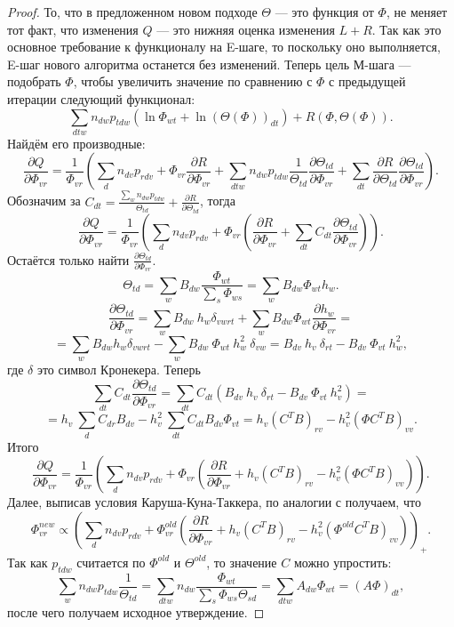 \begin{proof}
То, что в предложенном новом подходе $\Theta$ --- это функция от $\Phi$, не меняет тот факт, что изменения $Q$ --- это нижняя оценка изменения $L + R$. Так как это основное требование к функционалу на E-шаге, то поскольку оно выполняется, E-шаг нового алгоритма останется без изменений. Теперь цель М-шага --- подобрать $\Phi$, чтобы увеличить значение по сравнению с $\Phi$ с предыдущей итерации следующий функционал: 
\[
\sum_{dtw} n_{dw} p_{tdw} \left( \ln \Phi_{wt} + \ln (\Theta(\Phi))_{dt}\right) + R(\Phi, \Theta(\Phi)).
\]
Найдём его производные:
\[
\frac{\partial{Q}}{\partial{\Phi_{vr}}} = \frac{1}{\Phi_{vr}} \left( \sum_{d} n_{dv} p_{rdv} + \Phi_{vr} \frac{\partial{R}}{\partial{\Phi_{vr}}} + \sum_{dtw} n_{dw} p_{tdw} \frac{1}{\Theta_{td}} \frac{\partial{\Theta_{td}}}{\partial{\Phi_{vr}}} +  \sum_{dt} \frac{\partial{R}}{\partial{\Theta_{td}}} \frac{\partial{\Theta_{td}}}{\partial{\Phi_{vr}}} \right).
\]
Обозначим за $C_{dt} = \displaystyle\frac{\sum_w n_{dw} p_{tdw} }{\Theta_{td}} + \frac{\partial{R}}{\partial{\Theta_{td}}}$, тогда
\[
\frac{\partial{Q}}{\partial{\Phi_{vr}}} = \frac{1}{\Phi_{vr}} \left( \sum_{d} n_{dv} p_{rdv} + \Phi_{vr}\left( \frac{\partial{R}}{\partial{\Phi_{vr}}} + \sum_{dt} C_{dt} \frac{\partial{\Theta_{td}}}{\partial{\Phi_{vr}}} \right) \right).
\]
Остаётся только найти $\displaystyle\frac{\partial{\Theta_{td}}}{\partial{\Phi_{vr}}}$.
\[
\Theta_{td} = \sum_{w} B_{dw} \frac{\Phi_{wt}}{\sum_s \Phi_{ws}} = \sum_{w} B_{dw} \Phi_{wt} h_w.
\]
\[
\frac{\partial{\Theta_{td}}}{\partial{\Phi_{vr}}} =  \sum_{w} B_{dw}~h_w \delta_{vwrt} +  \sum_{w} B_{dw} \Phi_{wt} \frac{\partial{h_w}}{\partial{\Phi_{vr}}} = 
\]
\[
= \sum_{w} B_{dw} h_w \delta_{vwrt} - \sum_{w} B_{dw}~\Phi_{wt}~h_w^2~\delta_{vw} =
B_{dv}~h_v~\delta_{rt} - B_{dv}~\Phi_{vt}~h_w^2,
\]
где $\delta$ это символ Кронекера. Теперь
\[
\sum_{dt} C_{dt} \frac{\partial{\Theta_{td}}}{\partial{\Phi_{vr}}} = \sum_{dt} C_{dt} \left( B_{dv}~h_v~\delta_{rt} - B_{dv}~\Phi_{vt}~h_v^2 \right) =  
\]
\[
= h_v~\sum_d C_{dr} B_{dv} -  h_v^2~\sum_{dt} C_{dt} B_{dv} \Phi_{vt} = h_v (C^T B)_{rv} - h_v^2 (\Phi C^T B)_{vv}.
\]
Итого
\[
\frac{\partial{Q}}{\partial{\Phi_{vr}}}  = \frac{1}{\Phi_{vr}} \left( \sum_{d} n_{dv} p_{rdv} + \Phi_{vr}\left( \frac{\partial{R}}{\partial{\Phi_{vr}}} + h_v (C^T B)_{rv} - h_v^2 (\Phi C^T B)_{vv} \right) \right).
\]
Далее, выписав условия Каруша-Куна-Таккера, по аналогии с \cite{vorontsov2015} получаем, что
\[
\Phi_{vr}^{new}  \propto \left( \sum_{d} n_{dv} p_{rdv} + \Phi_{vr}^{old} \left( \frac{\partial{R}}{\partial{\Phi_{vr}}} + h_v (C^T B)_{rv} - h_v^2 ({\Phi^{old}} C^T B)_{vv} \right) \right)_{+}.
\]
Так как $p_{tdw}$ считается по $\Phi^{old}$ и $\Theta^{old}$, то значение $C$ можно упростить:
\[
\sum_{w} n_{dw} p_{tdw} \frac{1}{\Theta_{td}}  = \sum_{dtw} n_{dw}\frac{\Phi_{wt}}{\sum_s \Phi_{ws} \Theta_{sd}}  = \sum_{dtw} A_{dw} \Phi_{wt} = \left( A \Phi \right)_{dt},
\]
после чего получаем исходное утверждение.
\end{proof}

